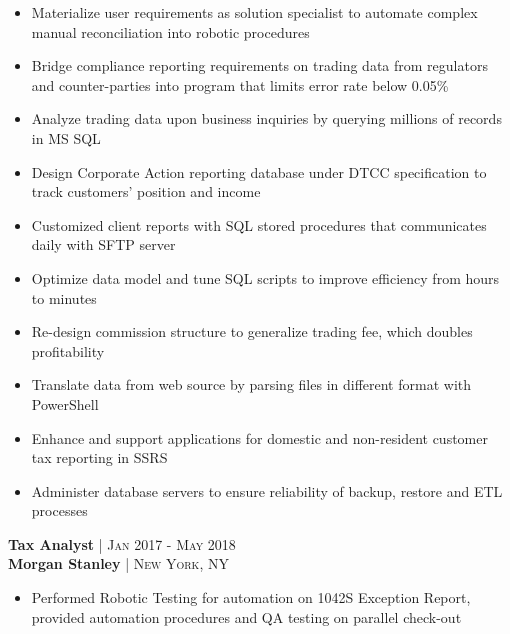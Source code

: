 \documentclass[10pt]{article} %
\begin{document}
{\begin{minipage}[t]{0.5\textwidth}
\begin{itemize}[leftmargin=*, topsep=2pt, partopsep=2.5pt]
\item Materialize user requirements as solution specialist to automate complex manual reconciliation into robotic procedures

\item Bridge compliance reporting requirements on trading data from regulators and counter-parties into program that limits error rate below 0.05\%

\item Analyze trading data upon business inquiries by querying millions of records in MS SQL 

\item Design Corporate Action reporting database under DTCC specification to track customers' position and income

\item Customized client reports with SQL stored procedures that communicates daily with SFTP server

\item Optimize data model and tune SQL scripts to improve efficiency from hours to minutes

\item Re-design commission structure to generalize trading fee, which doubles profitability

\item Translate data from web source by parsing files in different format with PowerShell

\item Enhance and support applications for domestic and non-resident customer tax reporting in SSRS 

\item Administer database servers to ensure reliability of backup, restore and ETL processes

\end{itemize}



{\raggedright\normalsize
\textbf{Tax Analyst} {\hfill\footnotesize\textsc{| Jan 2017 - May 2018}}\\ 
\textbf{Morgan Stanley} {\hfill\footnotesize\textsc{| New York, NY}}}

\begin{itemize}[leftmargin=*, topsep=2pt, partopsep=2.5pt]
\setlength\itemsep{1pt}

\item Performed Robotic Testing for automation on 1042S Exception Report, provided automation procedures and QA testing on parallel check-out
 

\end{itemize}
\end{minipage}}
\end{document}
